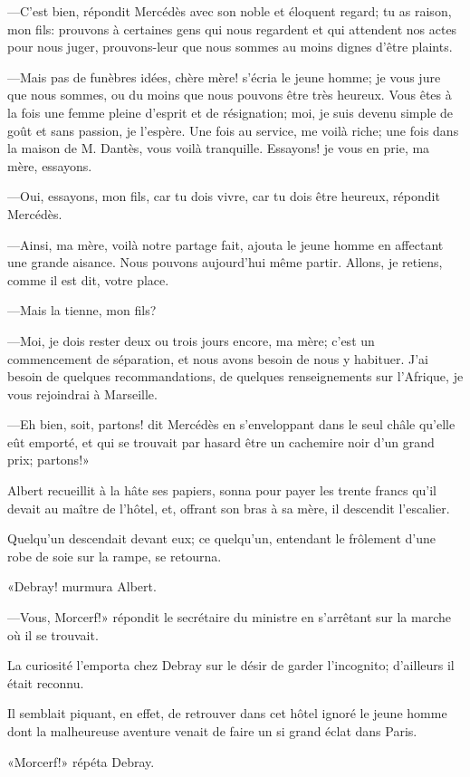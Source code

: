 —C'est bien, répondit Mercédès avec son noble et éloquent regard; tu as raison, mon fils: prouvons à certaines gens qui nous regardent et qui attendent nos actes pour nous juger, prouvons-leur que nous sommes au moins dignes d'être plaints. 

—Mais pas de funèbres idées, chère mère! s'écria le jeune homme; je vous jure que nous sommes, ou du moins que nous pouvons être très heureux. Vous êtes à la fois une femme pleine d'esprit et de résignation; moi, je suis devenu simple de goût et sans passion, je l'espère. Une fois au service, me voilà riche; une fois dans la maison de M. Dantès, vous voilà tranquille. Essayons! je vous en prie, ma mère, essayons. 

—Oui, essayons, mon fils, car tu dois vivre, car tu dois être heureux, répondit Mercédès. 

—Ainsi, ma mère, voilà notre partage fait, ajouta le jeune homme en affectant une grande aisance. Nous pouvons aujourd'hui même partir. Allons, je retiens, comme il est dit, votre place. 

—Mais la tienne, mon fils? 

—Moi, je dois rester deux ou trois jours encore, ma mère; c'est un commencement de séparation, et nous avons besoin de nous y habituer. J'ai besoin de quelques recommandations, de quelques renseignements sur l'Afrique, je vous rejoindrai à Marseille. 

—Eh bien, soit, partons! dit Mercédès en s'enveloppant dans le seul châle qu'elle eût emporté, et qui se trouvait par hasard être un cachemire noir d'un grand prix; partons!» 

Albert recueillit à la hâte ses papiers, sonna pour payer les trente francs qu'il devait au maître de l'hôtel, et, offrant son bras à sa mère, il descendit l'escalier. 

Quelqu'un descendait devant eux; ce quelqu'un, entendant le frôlement d'une robe de soie sur la rampe, se retourna. 

«Debray! murmura Albert. 

—Vous, Morcerf!» répondit le secrétaire du ministre en s'arrêtant sur la marche où il se trouvait. 

La curiosité l'emporta chez Debray sur le désir de garder l'incognito; d'ailleurs il était reconnu. 

Il semblait piquant, en effet, de retrouver dans cet hôtel ignoré le jeune homme dont la malheureuse aventure venait de faire un si grand éclat dans Paris. 

«Morcerf!» répéta Debray. 

